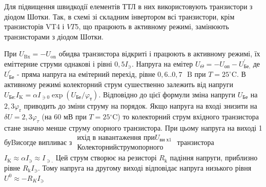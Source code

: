 \documentclass[a4paper,14pt]{extreport}
\begin{document}
  Для підвищення швидкодії елементів ТТЛ в них використовують транзистори з діодом Шотки. Так, в схемі зі складним інвертором  всі транзистори, крім транзисторів VT4 і $ V T 5 $, що працюють в активному режимі, замінюють транзисторами з діодом Шотки. 
  \begin{center}
  \end{center}
  
  При $ U _ {\text{Bx}} = - U _ {\text{on}} $ обидва транзистора відкриті і працюють в активному режимі, їх еміттерние струми однакові і рівні $ 0,5 I _ {\ni}. $ Напруга на емітер $ U _ {\Theta} = - U _ {\text {оп}} - U _ {\text {Бе,}} ^ {\prime} $ де $ U _ {\text {Бе}} ^ {\prime} $ - пряма напруга на емітерний перехід, рівне $ 0,6. .0,7 \text{~ B} $ при $ T = 25 ^ {\circ} \text{C}. $ В активному режимі колекторний струм сушественно залежить від напруги $ U _ {\text {Бе:}} I _ {\text{K}} = \alpha I _ {\ni 0} \exp \left (U _ {\text {Бе}} / \varphi _ {\text {т}} \right). $ Відповідно до цієї формули зміна напруги $ U_ { \text {Бе}} $ на $ 2,3 \varphi _ {\text{r}} $ приводить до зміни струму на порядок. Якщо напруга на вході знизити на $ \delta U = 2,3 \varphi _ {\tau} $ (на 60 мВ при $ T = 25 {} ^ {\circ} \text{C} $) то колекторний струм вхідного транзистора стане значно менше струму опорного транзистора. При цьому напруга на виході 1 буBисогде випливає з $ \begin {array} {c} \text {ихід в навантаження при}  U _ {\text {ви х1}} \\\text {Колекторний}  \text {струм}  \text {опорного} \end {array} $ транзистора $ I _ {\text{K}} \approx \alpha I _ {\ni} \approx I _ {\ni.} $ Цей струм
  створює на резисторі $ R _ {\text{k}} $ падіння напруги, приблизно рівне $ R _ {\text{k}} I _ {\ni}. $ Тому напруга на другому виході відповідає напруга низького рівня $ U ^ {0} \approx - R_ {K} I _ {\ni} $
\end{document}
